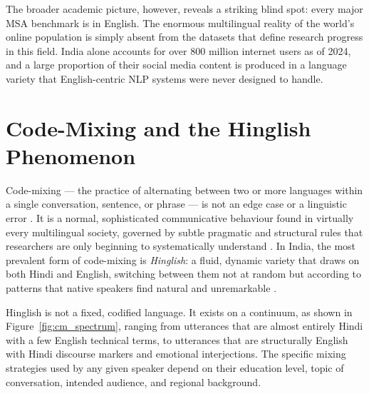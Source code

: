 The broader academic picture, however, reveals a striking blind spot: every major MSA benchmark is in English. The enormous multilingual reality of the world's online population is simply absent from the datasets that define research progress in this field. India alone accounts for over 800 million internet users as of 2024, and a large proportion of their social media content is produced in a language variety that English-centric NLP systems were never designed to handle.

\section{Code-Mixing and the Hinglish Phenomenon}

Code-mixing --- the practice of alternating between two or more languages within a single conversation, sentence, or phrase --- is not an edge case or a linguistic error \cite{barman2014code}. It is a normal, sophisticated communicative behaviour found in virtually every multilingual society, governed by subtle pragmatic and structural rules that researchers are only beginning to systematically understand \cite{srinivasan2020code}. In India, the most prevalent form of code-mixing is \textit{Hinglish}: a fluid, dynamic variety that draws on both Hindi and English, switching between them not at random but according to patterns that native speakers find natural and unremarkable \cite{joshi2016towards}.

Hinglish is not a fixed, codified language. It exists on a continuum, as shown in Figure~\ref{fig:cm_spectrum}, ranging from utterances that are almost entirely Hindi with a few English technical terms, to utterances that are structurally English with Hindi discourse markers and emotional interjections. The specific mixing strategies used by any given speaker depend on their education level, topic of conversation, intended audience, and regional background.


